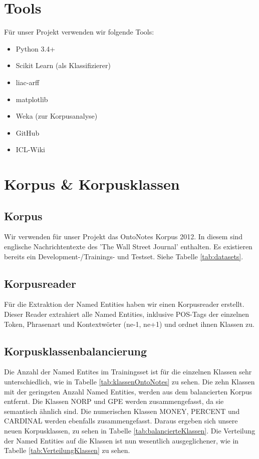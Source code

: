 \documentclass[a4paper, 11pt]{article}
\begin{document}
\section{Tools}
Für unser Projekt verwenden wir folgende Tools:
\begin{itemize}
\item Python 3.4+
\item Scikit Learn (als Klassifizierer)
\item liac-arff
\item matplotlib
\item Weka (zur Korpusanalyse)
\item GitHub
\item ICL-Wiki
\end{itemize}
\section{Korpus & Korpusklassen}
\subsection{Korpus}
Wir verwenden für unser Projekt das OntoNotes Korpus 2012. In diesem sind englische Nachrichtentexte des 'The Wall Street Journal' enthalten. Es existieren bereits ein Development-/Trainings- und Testset. Siehe Tabelle \ref{tab:datasets}.
\subsection{Korpusreader}
Für die Extraktion der Named Entities haben wir einen Korpusreader erstellt. Dieser Reader extrahiert alle Named Entities, inklusive POS-Tags der einzelnen Token, Phrasenart und Kontextwörter (ne-1, ne+1) und ordnet ihnen Klassen zu.
\subsection{Korpusklassenbalancierung}
Die Anzahl der Named Entites im Trainingsset ist für die einzelnen Klassen sehr unterschiedlich, wie in Tabelle \ref{tab:klassenOntoNotes} zu sehen. Die zehn Klassen mit der geringsten Anzahl Named Entities, werden aus dem balancierten Korpus entfernt. Die Klassen NORP und GPE werden zusammengefasst, da sie semantisch ähnlich sind. Die numerischen Klassen MONEY, PERCENT und CARDINAL werden ebenfalls zusammengefasst.
Daraus ergeben sich unsere neuen Korpusklassen, zu sehen in Tabelle \ref{tab:balancierteKlassen}.
Die Verteilung der Named Entities auf die Klassen ist nun wesentlich ausgeglichener, wie in Tabelle \ref{tab:VerteilungKlassen} zu sehen.
\end{document}
